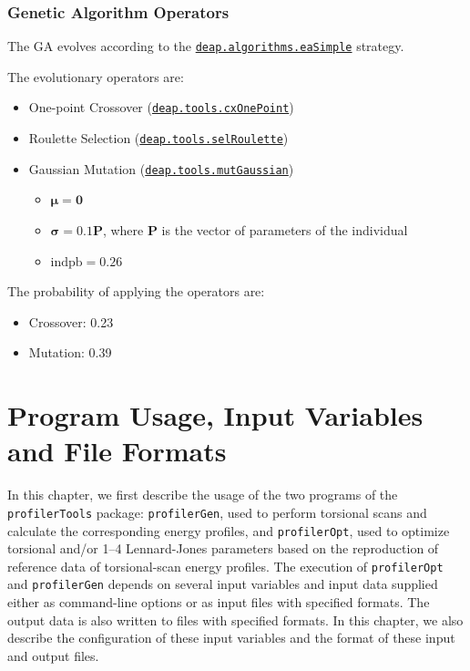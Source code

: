 \documentclass[10pt,a4paper,openany]{memoir}
\numberwithin{equation}{section}
\newcommand{\profileropt}[0]{\texttt{profilerOpt}}
\newcommand{\profilergen}[0]{\texttt{profilerGen}}
\newcommand{\profilertools}[0]{\texttt{profilerTools}}
\begin{document}



\subsection{Genetic Algorithm Operators}
\label{sec:ga-evolutionary-operators}

The GA evolves according to the \href{https://deap.readthedocs.io/en/master/api/algo.html#deap.algorithms.eaSimple}{\texttt{deap.algorithms.eaSimple}} strategy.

The evolutionary operators are:
\begin{itemize}
  \item One-point Crossover (\href{https://deap.readthedocs.io/en/master/api/tools.html#deap.tools.cxOnePoint}{\texttt{deap.tools.cxOnePoint}})
  \item Roulette Selection (\href{https://deap.readthedocs.io/en/master/api/tools.html#deap.tools.selRoulette}{\texttt{deap.tools.selRoulette}})
  \item Gaussian Mutation (\href{https://deap.readthedocs.io/en/master/api/tools.html#deap.tools.mutGaussian}{\texttt{deap.tools.mutGaussian}})
    \begin{itemize}
    \item $\boldsymbol{\mu} = \boldsymbol{0}$
    \item $\boldsymbol{\sigma} = 0.1\mathbf{P}$, where $\mathbf{P}$ is the vector of parameters of the individual
      \item $\text{indpb} = 0.26$
    \end{itemize}
\end{itemize}
The probability of applying the operators are:
\begin{itemize}
\item Crossover: 0.23
\item Mutation: 0.39
\end{itemize}

\chapter{Program Usage, Input Variables and File Formats}
\label{chap:file-formats}

In this chapter, we first describe the usage of the two programs of
the \profilertools{} package: \profilergen{}, used to perform
torsional scans and calculate the corresponding energy profiles, and
\profileropt{}, used to optimize torsional and/or 1--4 Lennard-Jones
parameters based on the reproduction of reference data of
torsional-scan energy profiles.  The execution of \profileropt{} and
\profilergen{} depends on several input variables and input data
supplied either as command-line options or as input files with
specified formats. The output data is also written to files with
specified formats. In this chapter, we also describe the configuration
of these input variables and the format of these input and output
files.
\end{document}
